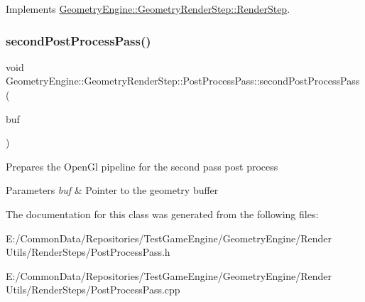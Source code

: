 Implements \mbox{\hyperlink{class_geometry_engine_1_1_geometry_render_step_1_1_render_step_a78676ad0b7b3fdfad5d1869f28426a83}{Geometry\+Engine\+::\+Geometry\+Render\+Step\+::\+Render\+Step}}.

\mbox{\label{class_geometry_engine_1_1_geometry_render_step_1_1_post_process_pass_a3d555943a9bc2b3105e71b8984b1ce0b}} 
\subsubsection{\texorpdfstring{secondPostProcessPass()}{secondPostProcessPass()}}
{\footnotesize\ttfamily void Geometry\+Engine\+::\+Geometry\+Render\+Step\+::\+Post\+Process\+Pass\+::second\+Post\+Process\+Pass (\begin{DoxyParamCaption}\item[{\mbox{\hyperlink{class_geometry_engine_1_1_geometry_buffer_1_1_g_buffer}{Geometry\+Buffer\+::\+G\+Buffer}} $\ast$}]{buf }\end{DoxyParamCaption})\hspace{0.3cm}{\ttfamily [protected]}}

Prepares the Open\+Gl pipeline for the second pass post process 
\begin{DoxyParams}{Parameters}
{\em buf} & Pointer to the geometry buffer \\
\hline
\end{DoxyParams}


The documentation for this class was generated from the following files\+:\begin{DoxyCompactItemize}
\item 
E\+:/\+Common\+Data/\+Repositories/\+Test\+Game\+Engine/\+Geometry\+Engine/\+Render Utils/\+Render\+Steps/Post\+Process\+Pass.\+h\item 
E\+:/\+Common\+Data/\+Repositories/\+Test\+Game\+Engine/\+Geometry\+Engine/\+Render Utils/\+Render\+Steps/Post\+Process\+Pass.\+cpp\end{DoxyCompactItemize}
